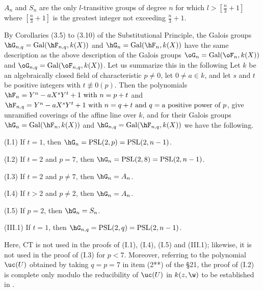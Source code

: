 $A_n$ and $S_n$ are the only $l$-transitive groups of 
degree $n$ for
which $l>[\frac n3+1]$ where $[\frac n3+1]$ is the  
greatest integer not exceeding $\frac n3+1$.
\endproclaim

By Corollaries (3.5) to (3.10) of the Substitutional 
Principle,
the Galois groups 
$\hG_{n,q}=\operatorname{Gal}(\hF_{n,q},k(X))$ and
$\hG_{n}=\operatorname{Gal}(\hF_{n},k(X))$ have the same 
description as the above
description of the Galois groups 
$\oG_{n}=\operatorname{Gal}(\oF_{n},k(X))$ and 
$\oG_{n,q}=\operatorname{Gal}(\oF_{n,q},k(X))$.
Let us summarize this in the following
{}
Let $k$ be an algebraically closed field of characteristic 
$p\ne 0$, let
$0\ne a\in k$, and let $s$ and $t$ be positive integers 
with 
$t\not\equiv 0(p)$. Then the polynomials  
$\hF_n=Y^n-aX^sY^t+1 \text{ with }n=p+t$ and
$\hF_{n,q}=Y^n-aX^sY^t+1 \text{ with }n=q+t
\text{ and }q=\text{a positive power of }p$, give 
unramified coverings of the
affine line over $k$,
and for their Galois groups 
$\hG_n=\operatorname{Gal}(\hF_n,k(X))$ and
$\hG_{n,q}=\operatorname{Gal}(\hF_{n,q},k(X))$ we have the 
following.

(I.1) If $t=1$, then $\hG_n=\operatorname{PSL}(2,p)=%
\operatorname{PSL}(2,n-1)$.

(I.2) If $t=2$ and $p=7$, then $\hG_n=%
\operatorname{PSL}(2,8)=\operatorname{PSL}(2,n-1)$.

(I.3) If $t=2$ and $p\neq 7$, then $\hG_n=A_n$.

(I.4) If $t>2$ and $p\neq 2$, then $\hG_n=A_n$.

(I.5) If $p=2$, then $\hG_n=S_n$.

(III.1) If $t=1$, then $\hG_{n,q}=\operatorname{PSL}(2,q)=%
\operatorname{PSL}(2,n-1)$.

Here, CT is not used in the proofs of (I.1), (I.4), (I.5) 
and (III.1);
likewise, it is not used in the proof of (I.3) for $p<7$.
Moreover, referring to the polynomial $\uc(U)$ obtained by 
taking
$q=p=7$ in item (2**) of the \S21, the proof of (I.2) is 
complete only modulo the reducibility of $\uc(U)$ in 
$k(z,\w)$ to 
be established in \cite{A7}.

